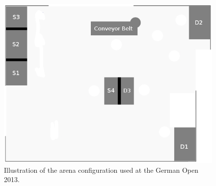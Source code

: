 \begin{figure}
\includegraphics[width= \textwidth ]{../images/example_map_go13.png}
\caption{Illustration of the arena configuration used at the German Open 2013.}
\label{fig:example_map_go13}
\end{figure}
